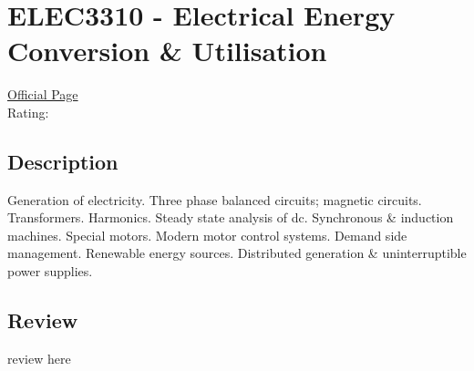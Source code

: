 \hypertarget{ELEC3310}{\section{ELEC3310 - Electrical Energy Conversion \& Utilisation}}

\large
\textcolor{turbo_purple}{\href{https://my.uq.edu.au/programs-courses/course.html?course_code=ELEC3310}{Official Page}} \\
Rating: \cstar\cstar\cstar\cstar\ostar

\normalsize
\subsection*{Description}
Generation of electricity.
Three phase balanced circuits; magnetic circuits.
Transformers.
Harmonics.
Steady state analysis of dc.
Synchronous \& induction machines.
Special motors.
Modern motor control systems.
Demand side management.
Renewable energy sources.
Distributed generation \& uninterruptible power supplies.

\subsection*{Review}
review here
